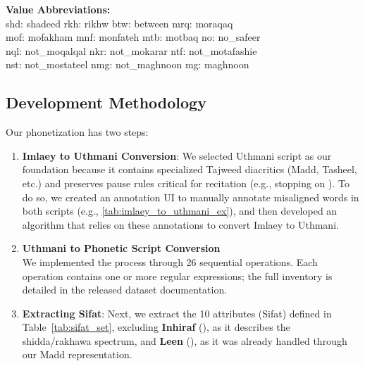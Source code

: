 \begin{table}[h]
\begin{center}
		\textbf{Value Abbreviations:} \\
		shd: shadeed \quad rkh: rikhw \quad btw: between \quad mrq: moraqaq \\
		mof: mofakham \quad mnf: monfateh \quad mtb: motbaq \quad no: no\_safeer \\
		nql: not\_moqalqal \quad nkr: not\_mokarar \quad ntf: not\_motafashie \\
		nst: not\_mostateel \quad nmg: not\_maghnoon \quad mg: maghnoon
	\end{center}
	\caption{Examples of Uthmani to Phonetic Script Conversion with Sifat Attributes. This example shows the phonetization of word () row by row: The first row shows conversion of () to () with its sifat in the row, following the second row. For the fourth row, showing the madd Lazim rule with 6 beats phoneticized as 6 alifs (), same as the sixth row but with damma represented as 6 waw\_madd (). And for the fifth row we notice that we converted () to () disassembling shadda. The last row shows the normal madd of yaa with two beats represented as two yadd\_madd ()}
	\label{tab:examples_with_sifat}
\end{table}

\subsection{Development Methodology}
Our phonetization has two steps:
\begin{enumerate}
	\item \textbf{Imlaey to Uthmani Conversion}: We selected Uthmani script as our foundation because it contains specialized Tajweed diacritics (Madd, Tasheel, etc.) and preserves pause rules critical for recitation (e.g., stopping on ). To do so, we created an annotation UI to manually annotate misaligned words in both scripts (e.g., \ref{tab:imlaey_to_uthmani_ex}), and then developed an algorithm that relies on these annotations to convert Imlaey to Uthmani.
	\item \textbf{Uthmani to Phonetic Script Conversion} \\
	      We implemented the process through 26 sequential operations. Each operation contains one or more regular expressions; the full inventory is detailed in the released dataset documentation.

	\item \textbf{Extracting Sifat}: Next, we extract the 10 attributes (Sifat) defined in Table~\ref{tab:sifat_set}, excluding \textbf{Inhiraf} (), as it describes the shidda/rakhawa spectrum, and \textbf{Leen} (), as it was already handled through our Madd representation.
\end{enumerate}

